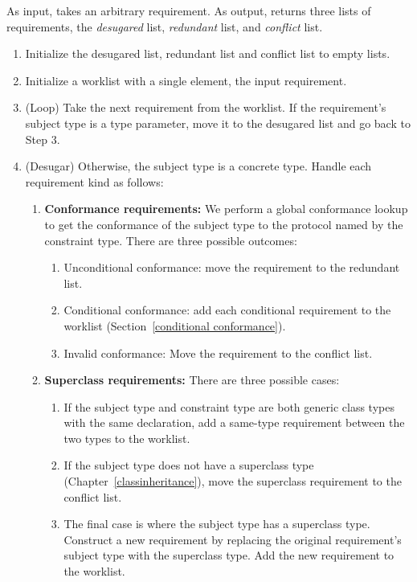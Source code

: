 \documentclass[../generics]{subfiles}
\begin{document}
\begin{algorithm}\label{requirement desugaring algorithm}
As input, takes an arbitrary requirement. As output, returns three lists of requirements, the \emph{desugared} list, \emph{redundant} list, and \emph{conflict} list.
\begin{enumerate}
\item Initialize the desugared list, redundant list and conflict list to empty lists.
\item Initialize a worklist with a single element, the input requirement.
\item (Loop) Take the next requirement from the worklist. If the requirement's subject type is a type parameter, move it to the desugared list and go back to Step 3.
\item (Desugar) Otherwise, the subject type is a concrete type. Handle each requirement kind as follows:
\begin{enumerate}
\item \textbf{Conformance requirements:} We perform a global conformance lookup to get the conformance of the subject type to the protocol named by the constraint type. There are three possible outcomes:
\begin{enumerate}
\item Unconditional conformance: move the requirement to the redundant list.
\item Conditional conformance: add each conditional requirement to the worklist (Section~\ref{conditional conformance}).
\item Invalid conformance: Move the requirement to the conflict list.
\end{enumerate}
\item \textbf{Superclass requirements:} There are three possible cases:
\begin{enumerate}
\item If the subject type and constraint type are both generic class types with the same declaration, add a same-type requirement between the two types to the worklist.
\item If the subject type does not have a superclass type (Chapter~\ref{classinheritance}), move the superclass requirement to the conflict list.
\item The final case is where the subject type has a superclass type. Construct a new requirement by replacing the original requirement's subject type with the superclass type. Add the new requirement to the worklist.

\end{enumerate}
\end{enumerate}
\end{enumerate}
\end{algorithm}
\end{document}
